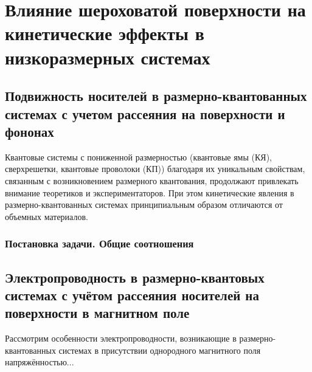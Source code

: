 \chapter{Влияние шероховатой поверхности на кинетические эффекты в низкоразмерных системах} \label{chapt3}

\section{Подвижность носителей в размерно-квантованных системах с учетом рассеяния на поверхности и фононах} \label{sect3_1}

Квантовые системы с пониженной размерностью (квантовые ямы (КЯ), сверхрешетки, квантовые проволоки (КП)) благодаря их уникальным свойствам, связанным с возникновением размерного квантования, продолжают привлекать внимание теоретиков и экспериментаторов. При этом кинетические явления в размерно-квантованных системах принципиальным образом отличаются от объемных материалов. 

\subsection{Постановка задачи. Общие соотношения} \label{subsect3_1_1}

\section{Электропроводность в размерно-квантовых системах с учётом рассеяния носителей на поверхности в магнитном поле} \label{sect3_2}

Рассмотрим особенности электропроводности, возникающие в размерно-квантованных системах в присутствии однородного магнитного поля напряжённостью...

